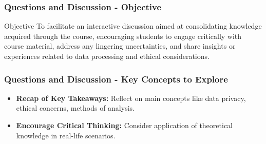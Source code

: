 \documentclass[aspectratio=169]{beamer}
\begin{document}
\begin{frame}[fragile]
    \frametitle{Questions and Discussion - Objective}
    \begin{block}{Objective}
        To facilitate an interactive discussion aimed at consolidating knowledge acquired through the course, encouraging students to engage critically with course material, address any lingering uncertainties, and share insights or experiences related to data processing and ethical considerations.
    \end{block}
\end{frame}

\begin{frame}[fragile]
    \frametitle{Questions and Discussion - Key Concepts to Explore}
    \begin{itemize}
        \item \textbf{Recap of Key Takeaways:} Reflect on main concepts like data privacy, ethical concerns, methods of analysis.
        \item \textbf{Encourage Critical Thinking:} Consider application of theoretical knowledge in real-life scenarios.
    \end{itemize}
\end{frame}
\end{document}
